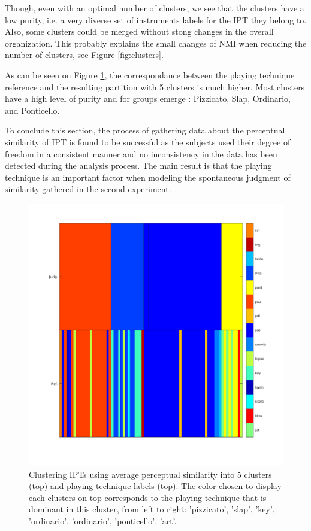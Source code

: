 \documentclass{article}
\makeatletter
\newcommand*{\ie}{i.e.\@\xspace}
\newcommand{\ipt}{IPT\xspace}
\newcommand{\ipts}{IPTs\xspace}
\makeatother
\begin{document}
Though, even with an optimal number of clusters, we see that the clusters have  a low purity, \ie{} a very diverse set of instruments labels for the \ipt they belong to. Also, some clusters could be merged without stong changes in the overall organization. This probably explains the small changes of NMI when reducing the number of clusters, see Figure \ref{fig:clusters}.

As can be seen on Figure \ref{fig:gm}, the correspondance between the playing technique reference and the resulting partition with 5 clusters is much higher. Most clusters have a high level of purity and for groups emerge : Pizzicato, Slap, Ordinario, and Ponticello.

To conclude this section, the process of gathering data about the perceptual similarity of \ipt is found to be successful as the subjects used their degree of freedom in a consistent manner and no inconsistency in the data has been detected during the analysis process. The main result is that the playing technique is an important factor when modeling the spontaneous judgment of similarity gathered in the second experiment.


\begin{figure}
\center
\includegraphics[width = \textwidth]{figures/groupModes.png}
\caption{Clustering \ipts using average perceptual similarity into 5 clusters (top) and playing technique labels (top). The color chosen to display each clusters on top corresponds to the playing technique that is dominant in this cluster, from left to right: 'pizzicato', 'slap', 'key', 'ordinario', 'ordinario', 'ponticello', 'art'.}
\label{fig:gm}
\end{figure}
\end{document}
